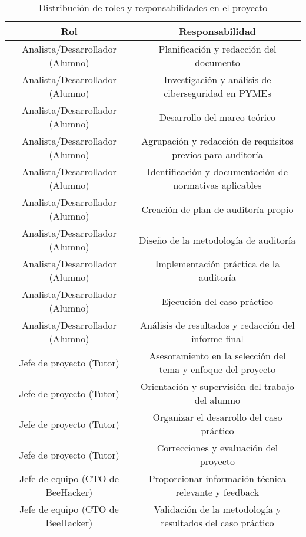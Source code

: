 \documentclass[a4paper, 10pt]{article}
\begin{document}
\begin{table}[h!]
    \centering
    \begin{tabular}{|c|c|}

        \hline
        \textbf{Rol} & \textbf{Responsabilidad} \\
        \hline
        Analista/Desarrollador (Alumno) & Planificación y redacción del documento \\
        \hline
        Analista/Desarrollador (Alumno) & Investigación y análisis de ciberseguridad en PYMEs \\
        \hline
        Analista/Desarrollador (Alumno) & Desarrollo del marco teórico \\
        \hline
        Analista/Desarrollador (Alumno) & Agrupación y redacción de requisitos previos para auditoría \\
        \hline
        Analista/Desarrollador (Alumno) & Identificación y documentación de normativas aplicables \\
        \hline
        Analista/Desarrollador (Alumno) & Creación de plan de auditoría propio \\
        \hline
        Analista/Desarrollador (Alumno) & Diseño de la metodología de auditoría \\
        \hline
        Analista/Desarrollador (Alumno) & Implementación práctica de la auditoría \\
        \hline
        Analista/Desarrollador (Alumno) & Ejecución del caso práctico \\
        \hline
        Analista/Desarrollador (Alumno) & Análisis de resultados y redacción del informe final \\
        \hline
        Jefe de proyecto (Tutor) & Asesoramiento en la selección del tema y enfoque del proyecto \\
        \hline
        Jefe de proyecto (Tutor) & Orientación y supervisión del trabajo del alumno \\
        \hline
        Jefe de proyecto (Tutor) & Organizar el desarrollo del caso práctico \\
        \hline
        Jefe de proyecto (Tutor) & Correcciones y evaluación del proyecto \\
        \hline
        Jefe de equipo (CTO de BeeHacker) & Proporcionar información técnica relevante y feedback \\
        \hline
        Jefe de equipo (CTO de BeeHacker) & Validación de la metodología y resultados del caso práctico \\
        \hline

    \end{tabular}
    \caption{Distribución de roles y responsabilidades en el proyecto}
    \label{tab:distribucion_roles}
\end{table}
\end{document}

